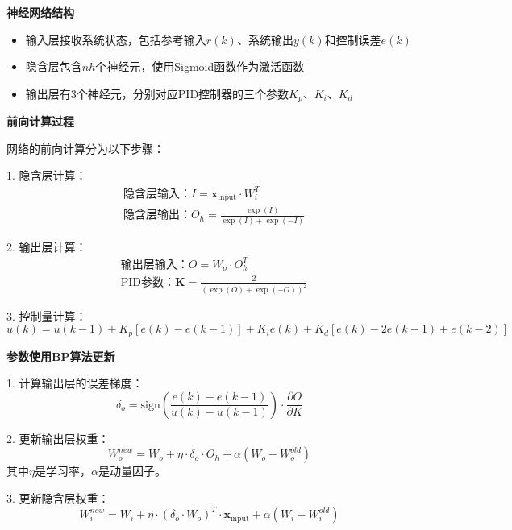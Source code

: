 \documentclass[12pt,a4paper,UTF8]{article}
\begin{document}
\textbf{神经网络结构}
\begin{itemize}
\item 输入层接收系统状态，包括参考输入\(r(k)\)、系统输出\(y(k)\)和控制误差\(e(k)\)
\item 隐含层包含\(nh\)个神经元，使用Sigmoid函数作为激活函数
\item 输出层有3个神经元，分别对应PID控制器的三个参数\(K_p\)、\(K_i\)、\(K_d\)
\end{itemize}

\textbf{前向计算过程}

网络的前向计算分为以下步骤：

1. 隐含层计算：
   \begin{equation}
   \begin{aligned}
   & \text{隐含层输入：} I = \mathbf{x}_\text{input} \cdot W_i^T \\
   & \text{隐含层输出：} O_h = \frac{\exp(I)}{\exp(I) + \exp(-I)}
   \end{aligned}
   \end{equation}

2. 输出层计算：
   \begin{equation}
   \begin{aligned}
   & \text{输出层输入：} O = W_o \cdot O_h^T \\
   & \text{PID参数：} \mathbf{K} = \frac{2}{(\exp(O) + \exp(-O))^2}
   \end{aligned}
   \end{equation}

3. 控制量计算：
   \begin{equation}
   u(k) = u(k-1) + K_p[e(k) - e(k-1)] + K_i e(k) + K_d[e(k) - 2e(k-1) + e(k-2)]
   \end{equation}

\textbf{参数使用BP算法更新}


1. 计算输出层的误差梯度：
   \begin{equation}
   \delta_o = \text{sign}\left(\frac{e(k)-e(k-1)}{u(k)-u(k-1)}\right) \cdot \frac{\partial O}{\partial K}
   \end{equation}

2. 更新输出层权重：
   \begin{equation}
   W_o^{new} = W_o + \eta \cdot \delta_o \cdot O_h + \alpha(W_o - W_o^{old})
   \end{equation}
   其中\(\eta\)是学习率，\(\alpha\)是动量因子。

3. 更新隐含层权重：
   \begin{equation}
   W_i^{new} = W_i + \eta \cdot (\delta_o \cdot W_o)^T \cdot \mathbf{x}_\text{input} + \alpha(W_i - W_i^{old})
   \end{equation}
\end{document}
